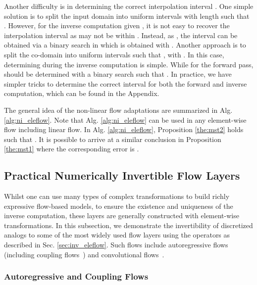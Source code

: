 \documentclass{article}
\begin{document}
Another difficulty is in determining the correct interpolation interval . One simple solution is to split the input domain into uniform intervals with length  such that . However, for the inverse computation given , it is not easy to recover the interpolation interval as  may not be within . Instead, as , the interval  can be obtained via a binary search in which  is obtained with . Another approach is to split the co-domain into uniform intervals such that , with . In this case, determining  during the inverse computation is simple. While for the forward pass,  should be determined with a binary search such that . In practice, we have simpler tricks to determine the correct interval  for both the forward and inverse computation, which can be found in the Appendix.

The general idea of the non-linear flow adaptations are summarized in Alg. \ref{alg:ni_eleflow}. Note that Alg. \ref{alg:ni_eleflow} can be used in any element-wise flow including linear flow. In Alg. \ref{alg:ni_eleflow}, Proposition \ref{the:mst2} holds such that 
. 
It is possible to arrive at a similar conclusion in Proposition \ref{the:mst1} where the corresponding error is . 

\subsection{Practical Numerically Invertible Flow Layers}
\label{sec:inv_general}

Whilst one can use many types of complex transformations to build richly expressive flow-based models, to ensure the existence and uniqueness of the inverse computation, these layers are generally constructed with element-wise transformations. In this subsection, we demonstrate the invertibility of discretized analogs to some of the most widely used flow layers using the operators as described in Sec. \ref{sec:inv_eleflow}. Such flows include autoregressive flows~\cite{huang2018neural} (including coupling flows~\cite{dinh2014nice,dinh2016density,ho2019flow++}) and  convolutional flows~\cite{kingma2018glow}. 

\subsubsection{Autoregressive and Coupling Flows}
\end{document}
